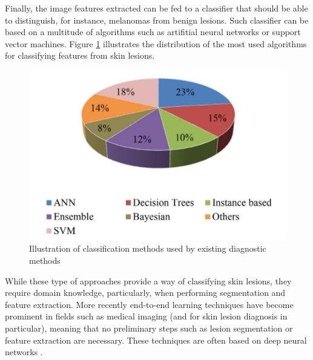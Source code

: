 Finally, the image features extracted can be fed to a classifier that should be able to distinguish, for instance, melanomas from benign lesions. Such classifier can be based on a multitude of algorithms such as artifitial neural networks or support vector machines. Figure \ref{fig:classificationalgorithms} illustrates the distribution of the most used algorithms for classifying features from skin lesions. \par

\begin{figure}[ht]
  \centering
    \includegraphics[width=0.5\linewidth]{figs/classificationalgorithms.png}
  \caption{Illustration of classification methods used by existing diagnostic methods \cite{Pathan2018}}
  \label{fig:classificationalgorithms}
\end{figure}

While these type of approaches provide a way of classifying skin lesions, they require domain knowledge, particularly, when performing segmentation and feature extraction. More recently end-to-end learning techniques have become prominent in fields such as medical imaging (and for skin lesion diagnosis in particular), meaning that no preliminary steps such as lesion segmentation or feature extraction are necessary. These techniques are often based on deep neural networks \cite{?}.

